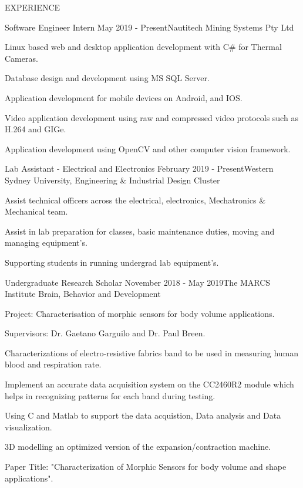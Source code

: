 \documentclass{resume} %
\begin{document}
\begin{rSection}{EXPERIENCE}

\begin{rSubsection}{Software Engineer Intern} {May 2019 - Present}{\faInstitution Nautitech Mining Systems Pty Ltd}{}
\item Linux based web and desktop application development with C\# for Thermal Cameras.
\item Database design and development using MS SQL Server.
\item Application development for mobile devices on Android, and IOS.
\item Video application development using raw and compressed video protocols such as H.264 and GIGe.
\item Application development using OpenCV and other computer vision framework.

\end{rSubsection}

\begin{rSubsection}{Lab Assistant - Electrical and Electronics} {February 2019 - Present}{\faInstitution Western Sydney University, Engineering \& Industrial Design Cluster}{}
\item Assist technical officers across the electrical, electronics, Mechatronics \& Mechanical team.
\item Assist in lab preparation for classes, basic maintenance duties, moving and managing equipment's.
\item Supporting students in running undergrad lab equipment's.
\end{rSubsection}

\begin{rSubsection}{Undergraduate Research Scholar} {November 2018 - May 2019}{\faInstitution The MARCS Institute Brain, Behavior and Development}{}
\item Project: Characterisation of morphic sensors for body volume applications.
\item Supervisors: Dr. Gaetano Garguilo and Dr. Paul Breen.
\item Characterizations of electro-resistive fabrics band to be used in measuring human blood and respiration rate.
\item Implement an accurate data acquisition system on the CC2460R2 module which helps in recognizing patterns for each band during testing. 
\item Using C and Matlab to support the data acquistion, Data analysis and Data visualization.
\item 3D modelling an optimized version of the expansion/contraction machine.
\item Paper Title: "Characterization of Morphic Sensors for body volume and shape applications".
\end{rSubsection}


\end{rSection}
\end{document}
